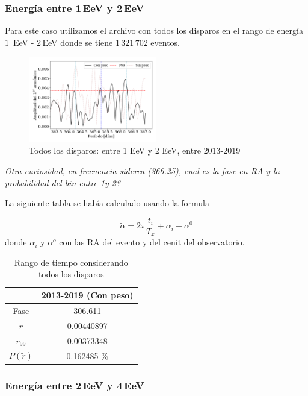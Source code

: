 \subsubsection{Energía entre 1\,EeV y 2\,EeV}

Para este caso utilizamos el archivo con todos los disparos en el rango de energía $1\,$ EeV - $2\,$EeV donde se tiene $1\,321\,702$ eventos.

\begin{figure}[H]
	\centering
	\includegraphics[width=0.5\textwidth]{Graficos/2019_AllTriggers_1_2_EeV_con_vs_sin_peso.png}
	\caption{Todos los disparos: entre 1 EeV y 2 EeV, entre 2013-2019}
	\label{fig:12w}
\end{figure}

\emph{Otra curiosidad, en frecuencia siderea (366.25), cual es la fase en RA y la probabilidad del bin entre 1y 2?}

La siguiente tabla se había calculado usando la formula 

\begin{equation}
	\tilde \alpha = 2\pi \frac{t_i}{T_x} +\alpha_i - \alpha^0
\end{equation}
donde $\alpha_i$ y $\alpha^o$ con las RA del evento y del cenit del observatorio.

	\begin{table}[H]
	\centering
		\begin{tabular}{c|c}
	 		&  2013-2019 (Con peso)	 \\ \hline
	Fase		& 	306.611				 \\
	$r$ 		&  0.00440897			\\
	$r_{99}$ 	&  0.00373348			\\
	$P(\tilde r)$ 	    & 	0.162485	\%	 \\
		\end{tabular}
	\caption{Rango de tiempo considerando todos los disparos} 	\label{rango_corto}
	\end{table}


\subsubsection{Energía entre 2\,EeV y 4\,EeV}

